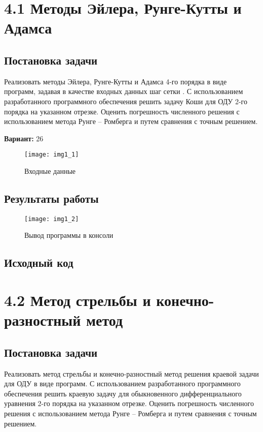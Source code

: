 \section* {4.1 Методы Эйлера, Рунге-Кутты и Адамса}

\subsection{Постановка задачи}
Реализовать методы Эйлера, Рунге-Кутты и Адамса 4-го порядка в виде программ, задавая в качестве входных данных шаг сетки  . С использованием разработанного программного обеспечения решить задачу Коши для ОДУ 2-го порядка на указанном отрезке. Оценить погрешность численного решения с использованием метода Рунге – Ромберга и путем сравнения с точным решением. 

{\bfseries Вариант:} 26

\begin{figure}[h!]
\centering
\texttt{[image: img1\_1]}
\caption{Входные данные}
\end{figure}

\subsection{Результаты работы}
\begin{figure}[h!]
\centering
\texttt{[image: img1\_2]}
\caption{Вывод программы в консоли}
\end{figure}

\pagebreak

\subsection{Исходный код}


\pagebreak

\section* {4.2 Метод стрельбы и конечно-разностный метод}

\subsection{Постановка задачи}
Реализовать метод стрельбы и конечно-разностный метод решения краевой задачи для ОДУ в виде программ. С использованием разработанного программного обеспечения решить краевую задачу для обыкновенного дифференциального уравнения 2-го порядка на указанном отрезке. Оценить погрешность численного решения с использованием метода Рунге – Ромберга и путем сравнения с точным решением. 

